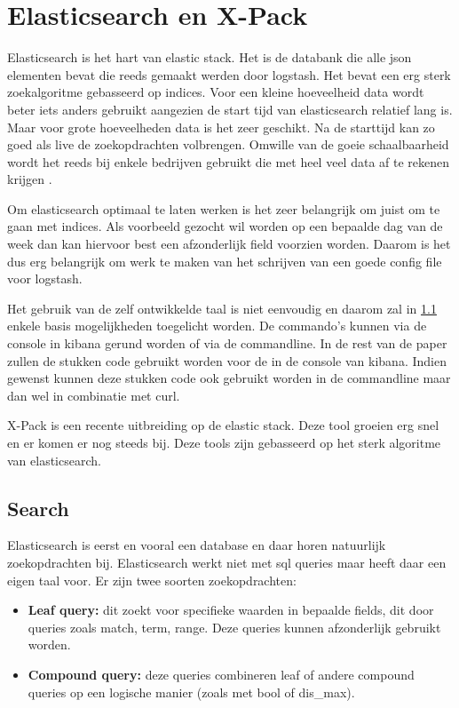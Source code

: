 
\chapter{Elasticsearch en X-Pack}
\label{ch:elasticsearch-xpack}


Elasticsearch is het hart van elastic stack. Het is de databank die alle json elementen bevat die reeds gemaakt werden door logstash. 
Het bevat een erg sterk zoekalgoritme gebasseerd op indices. Voor een kleine hoeveelheid data wordt beter iets anders gebruikt aangezien de start tijd van elasticsearch relatief lang is.
Maar voor grote hoeveelheden data is het zeer geschikt. Na de starttijd kan zo goed als live de zoekopdrachten volbrengen. 
Omwille van de goeie schaalbaarheid wordt het reeds bij enkele bedrijven gebruikt die met heel veel data af te rekenen krijgen \autocite{15companies}.

Om elasticsearch optimaal te laten werken is het zeer belangrijk om juist om te gaan met indices. Als voorbeeld gezocht wil worden op een bepaalde dag van de week dan kan hiervoor best een afzonderlijk field voorzien worden. 
Daarom is het dus erg belangrijk om werk te maken van het schrijven van een goede config file voor logstash.

Het gebruik van de zelf ontwikkelde taal is niet eenvoudig en daarom zal in \ref{sec:search} enkele basis mogelijkheden toegelicht worden.
De commando's kunnen via de console in kibana gerund worden of via de commandline. In de rest van de paper zullen de stukken code gebruikt worden voor de in de console van kibana.
Indien gewenst kunnen deze stukken code ook gebruikt worden in de commandline maar dan wel in combinatie met curl.

X-Pack is een recente uitbreiding op de elastic stack. Deze tool groeien erg snel en er komen er nog steeds bij. 
Deze tools zijn gebasseerd op het sterk algoritme van elasticsearch. 

\section{Search}
\label{sec:search}

Elasticsearch is eerst en vooral een database en daar horen natuurlijk zoekopdrachten bij. Elasticsearch werkt niet met sql queries maar heeft daar een eigen taal voor. Er zijn twee soorten zoekopdrachten:
\begin{itemize}
	\item \textbf{Leaf query: } dit zoekt voor specifieke waarden in bepaalde fields, dit door queries zoals match, term, range. Deze queries kunnen afzonderlijk gebruikt worden.

	\item \textbf{Compound query: } deze queries combineren leaf of andere compound queries op een logische manier (zoals met bool of dis\_max).
\end{itemize}

